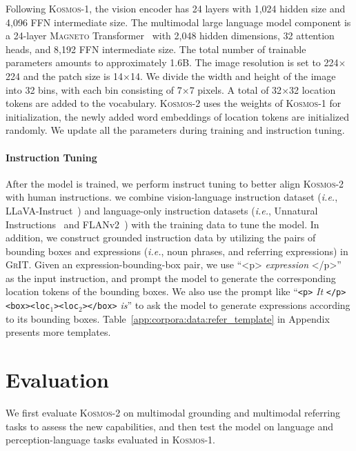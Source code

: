 \documentclass{article}
\newcommand\kosmos{\textsc{Kosmos-1}}
\newcommand\our{\textsc{Kosmos-2}}
\newcommand\ie{\textit{i.e.}}
\begin{document}
Following \kosmos{}, the vision encoder has 24 layers with 1,024 hidden size and 4,096 FFN intermediate size.
The multimodal large language model component is a 24-layer \textsc{Magneto} Transformer~\cite{magneto,torchscale} with 2,048 hidden dimensions, 32 attention heads, and 8,192 FFN intermediate size.
The total number of trainable parameters amounts to approximately 1.6B.
The image resolution is set to 224$\times$224 and the patch size is 14$\times$14.
We divide the width and height of the image into 32 bins, with each bin consisting of 7$\times$7 pixels.
A total of 32$\times$32 location tokens are added to the vocabulary.
\our{} uses the weights of \kosmos{} for initialization, the newly added word embeddings of location tokens are initialized randomly.
We update all the parameters during training and instruction tuning.

\paragraph{Instruction Tuning} After the model is trained, we perform instruct tuning to better align \our{} with human instructions.
we combine vision-language instruction dataset (\ie, LLaVA-Instruct~\cite{llava}) and language-only instruction datasets (\ie, Unnatural Instructions~\cite{unnatural} and FLANv2~\cite{flan2}) with the training data to tune the model.
In addition, we construct grounded instruction data by utilizing the pairs of bounding boxes and expressions (\ie, noun phrases, and referring expressions) in \textsc{GrIT}.
Given an expression-bounding-box pair, we use ``<p> \textit{{expression}} </p>'' as the input instruction, and prompt the model to generate the corresponding location tokens of the bounding boxes.
We also use the prompt like ``\texttt{<p>} \textit{It} \texttt{</p>}\texttt{<box>}\texttt{<loc$_1$>}\texttt{<loc$_2$>}\texttt{</box>} \textit{is}'' to ask the model to generate expressions according to its bounding boxes.
Table~\ref{app:corpora:data:refer_template} in Appendix presents more templates.


\section{Evaluation}
\label{sec:eval}

We first evaluate \our{} on multimodal grounding and multimodal referring tasks to assess the new capabilities, and then test the model on language and perception-language tasks evaluated in \kosmos{}.
\end{document}

